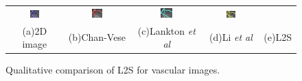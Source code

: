 \begin{figure}[t]
\begin{tabular}{@{}ccccc@{}}
\includegraphics[width=0.19\textwidth]{images/L2S_compare_region/vessel1_CV}	&
\includegraphics[width=0.19\textwidth]{images/L2S_compare_region/vessel1_Lankton} &
\includegraphics[width=0.19\textwidth]{images/L2S_compare_region/vessel1_Li}	&
\includegraphics[width=0.19\textwidth]{images/L2S_compare_region/vessel1_ours}	
\\
\scriptsize(a)2D image&\scriptsize(b)Chan-Vese&\scriptsize(c)Lankton \textit{et al}\cite{lankton_localCV}&\scriptsize(d)Li \textit{et al}\cite{li_region_scalable}&\scriptsize(e)L2S
\end{tabular}
\caption[L2S on vascular images]{Qualitative comparison of L2S for vascular images.}
\label{fig:l2s_compare_vessels}
\end{figure}
\clearpage

